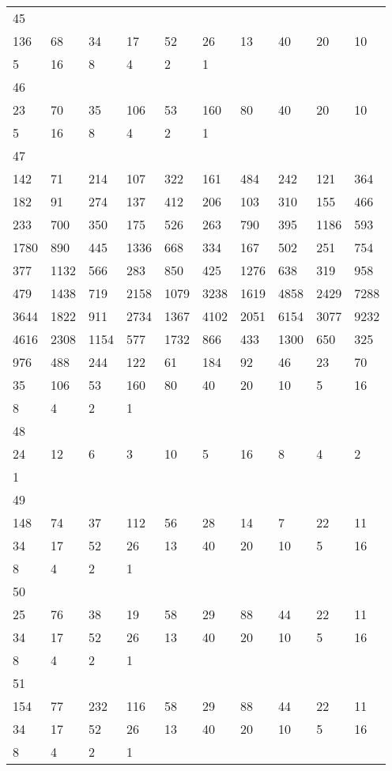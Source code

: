 \begin{longtable}{*{10}{l}}
45&&&&&&&&&\\
136& 68& 34& 17& 52& 26& 13& 40& 20& 10\\
5& 16& 8& 4& 2& 1& \\

46&&&&&&&&&\\
23& 70& 35& 106& 53& 160& 80& 40& 20& 10\\
5& 16& 8& 4& 2& 1& \\

47&&&&&&&&&\\
142& 71& 214& 107& 322& 161& 484& 242& 121& 364\\
182& 91& 274& 137& 412& 206& 103& 310& 155& 466\\
233& 700& 350& 175& 526& 263& 790& 395& 1186& 593\\
1780& 890& 445& 1336& 668& 334& 167& 502& 251& 754\\
377& 1132& 566& 283& 850& 425& 1276& 638& 319& 958\\
479& 1438& 719& 2158& 1079& 3238& 1619& 4858& 2429& 7288\\
3644& 1822& 911& 2734& 1367& 4102& 2051& 6154& 3077& 9232\\
4616& 2308& 1154& 577& 1732& 866& 433& 1300& 650& 325\\
976& 488& 244& 122& 61& 184& 92& 46& 23& 70\\
35& 106& 53& 160& 80& 40& 20& 10& 5& 16\\
8& 4& 2& 1& \\

48&&&&&&&&&\\
24& 12& 6& 3& 10& 5& 16& 8& 4& 2\\
1& \\

49&&&&&&&&&\\
148& 74& 37& 112& 56& 28& 14& 7& 22& 11\\
34& 17& 52& 26& 13& 40& 20& 10& 5& 16\\
8& 4& 2& 1& \\

50&&&&&&&&&\\
25& 76& 38& 19& 58& 29& 88& 44& 22& 11\\
34& 17& 52& 26& 13& 40& 20& 10& 5& 16\\
8& 4& 2& 1& \\

51&&&&&&&&&\\
154& 77& 232& 116& 58& 29& 88& 44& 22& 11\\
34& 17& 52& 26& 13& 40& 20& 10& 5& 16\\
8& 4& 2& 1& \\


\end{longtable}

